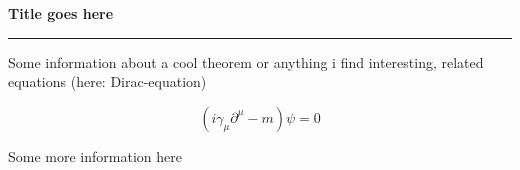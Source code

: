 
\begin{frame}
	\begin{block}{\color{white}\textbf{\Large{
					Title goes here
			}}}
		\vspace{-10pt}\rule{\textwidth}{0.5pt}
		\color{white}
		
		Some information about a cool theorem or anything i find interesting, related equations (here: Dirac-equation)
	
	\end{block}
	{\large
		
		\begin{equation*} 
			(i\gamma_{\mu}\partial^{\mu} - m)\psi = 0
		\end{equation*}
	}

	\begin{block}{}
	\color{white}
	
		Some more information here
		
	\end{block}
	

\end{frame}